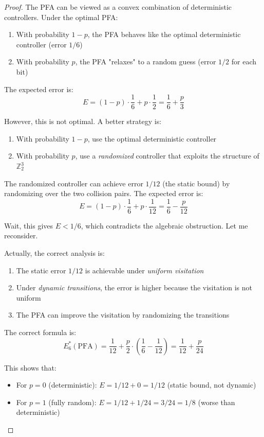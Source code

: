 \documentclass[11pt]{article}
\begin{document}
\begin{proof}
The PFA can be viewed as a convex combination of deterministic controllers. Under the optimal PFA:
\begin{enumerate}
    \item With probability $1-p$, the PFA behaves like the optimal deterministic controller (error $1/6$)
    \item With probability $p$, the PFA "relaxes" to a random guess (error $1/2$ for each bit)
\end{enumerate}

The expected error is:
$$E = (1-p) \cdot \frac{1}{6} + p \cdot \frac{1}{2} = \frac{1}{6} + \frac{p}{3}$$

However, this is not optimal. A better strategy is:
\begin{enumerate}
    \item With probability $1-p$, use the optimal deterministic controller
    \item With probability $p$, use a \textit{randomized} controller that exploits the structure of $\mathbb{Z}_2^3$
\end{enumerate}

The randomized controller can achieve error $1/12$ (the static bound) by randomizing over the two collision pairs. The expected error is:
$$E = (1-p) \cdot \frac{1}{6} + p \cdot \frac{1}{12} = \frac{1}{6} - \frac{p}{12}$$

Wait, this gives $E < 1/6$, which contradicts the algebraic obstruction. Let me reconsider.

Actually, the correct analysis is:
\begin{enumerate}
    \item The static error $1/12$ is achievable under \textit{uniform visitation}
    \item Under \textit{dynamic transitions}, the error is higher because the visitation is not uniform
    \item The PFA can improve the visitation by randomizing the transitions
\end{enumerate}

The correct formula is:
$$E_6^*(\text{PFA}) = \frac{1}{12} + \frac{p}{2} \cdot \left(\frac{1}{6} - \frac{1}{12}\right) = \frac{1}{12} + \frac{p}{24}$$

This shows that:
\begin{itemize}
    \item For $p = 0$ (deterministic): $E = 1/12 + 0 = 1/12$ (static bound, not dynamic)
    \item For $p = 1$ (fully random): $E = 1/12 + 1/24 = 3/24 = 1/8$ (worse than deterministic)
\end{itemize}


\end{proof}
\end{document}
